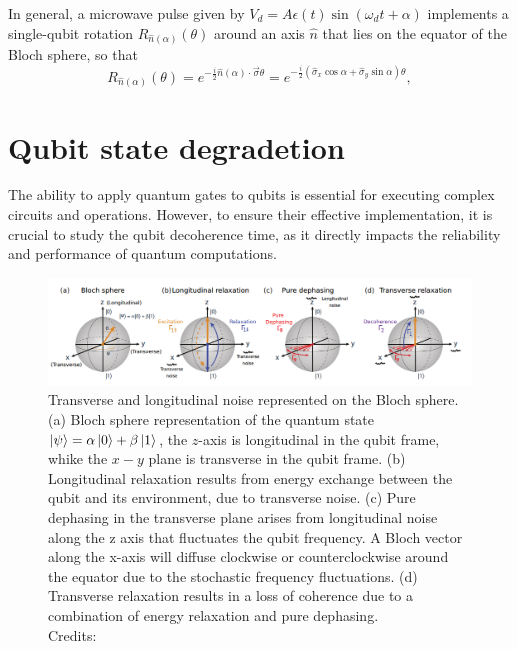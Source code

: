 In general, a microwave pulse given by $V_d = A\epsilon(t) \sin(\omega_d t + \alpha)$ implements a single-qubit rotation $R_{\hat{n}(\alpha)}(\theta)$ around an axis $\hat{n}$ that lies on the equator of the Bloch sphere, so that
\begin{equation}
    R_{\hat{n}(\alpha)}(\theta) = e^{-\frac{i}{2} \hat{n}(\alpha) \cdot \vec{\sigma} \theta} = e^{-\frac{i}{2} (\hat{\sigma}_x \cos \alpha + \hat{\sigma}_y \sin \alpha) \theta},
\end{equation}

\section{Qubit state degradetion}
The ability to apply quantum gates to qubits is essential for executing complex circuits and operations. 
However, to ensure their effective implementation, it is crucial to study the qubit decoherence time, as it directly impacts the reliability and performance of quantum computations.

\begin{figure}[h!]
    \centering
    \includegraphics[width=\textwidth]{figures/png/noise_model.png}
    \caption{Transverse and longitudinal noise represented on the Bloch sphere. 
    (a) Bloch sphere representation of the quantum state $\ket{\psi}= \alpha\ket{0} + \beta\ket{1}$, the $z$-axis is longitudinal in the qubit frame, whike the $x-y$ plane is transverse in the qubit frame.
    (b) Longitudinal relaxation results from energy exchange between the qubit and its environment, due to transverse noise.
    (c) Pure dephasing in the transverse plane arises from longitudinal noise along the z axis that fluctuates the qubit frequency. A Bloch vector along the x-axis will diffuse clockwise or counterclockwise around the equator due to the stochastic frequency fluctuations.
    (d)  Transverse relaxation results in a loss of coherence due to a combination of energy relaxation and pure dephasing. \\Credits: \cite{krantz_quantum_2019}}
    \label{fig:noise_model}
\end{figure}

